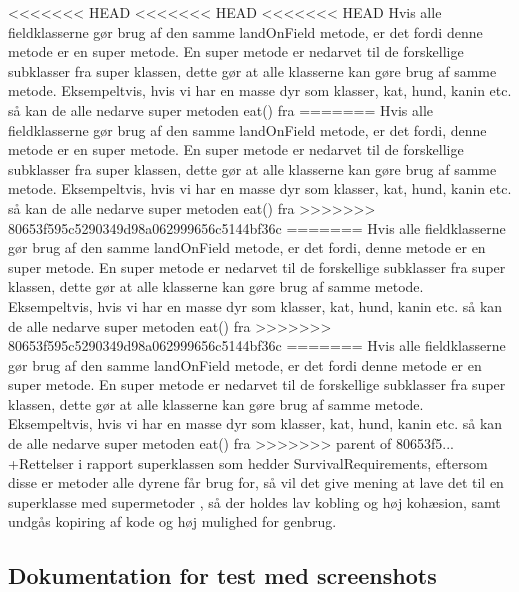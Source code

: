 <<<<<<< HEAD
<<<<<<< HEAD
<<<<<<< HEAD
Hvis alle fieldklasserne gør brug af den samme landOnField metode, er det fordi denne metode er en super metode. En super metode er nedarvet til de forskellige subklasser fra super klassen, dette gør at alle klasserne kan gøre brug af samme metode. Eksempeltvis, hvis vi har en masse dyr som klasser, kat, hund, kanin etc. så kan de alle nedarve super metoden eat() fra 
=======
Hvis alle fieldklasserne gør brug af den samme landOnField metode, er det fordi, denne metode er en super metode. En super metode er nedarvet til de forskellige subklasser fra super klassen, dette gør at alle klasserne kan gøre brug af samme metode. Eksempeltvis, hvis vi har en masse dyr som klasser, kat, hund, kanin etc. så kan de alle nedarve super metoden eat() fra 
>>>>>>> 80653f595c5290349d98a062999656c5144bf36c
=======
Hvis alle fieldklasserne gør brug af den samme landOnField metode, er det fordi, denne metode er en super metode. En super metode er nedarvet til de forskellige subklasser fra super klassen, dette gør at alle klasserne kan gøre brug af samme metode. Eksempeltvis, hvis vi har en masse dyr som klasser, kat, hund, kanin etc. så kan de alle nedarve super metoden eat() fra 
>>>>>>> 80653f595c5290349d98a062999656c5144bf36c
=======
Hvis alle fieldklasserne gør brug af den samme landOnField metode, er det fordi denne metode er en super metode. En super metode er nedarvet til de forskellige subklasser fra super klassen, dette gør at alle klasserne kan gøre brug af samme metode. Eksempeltvis, hvis vi har en masse dyr som klasser, kat, hund, kanin etc. så kan de alle nedarve super metoden eat() fra 
>>>>>>> parent of 80653f5... +Rettelser i rapport
superklassen som hedder SurvivalRequirements, eftersom disse er metoder alle dyrene får brug for, så vil det give mening at lave det til en superklasse med supermetoder
, så der holdes lav kobling og høj kohæsion, samt undgås kopiring af kode og høj mulighed for genbrug.

\subsection{Dokumentation for test med screenshots}
